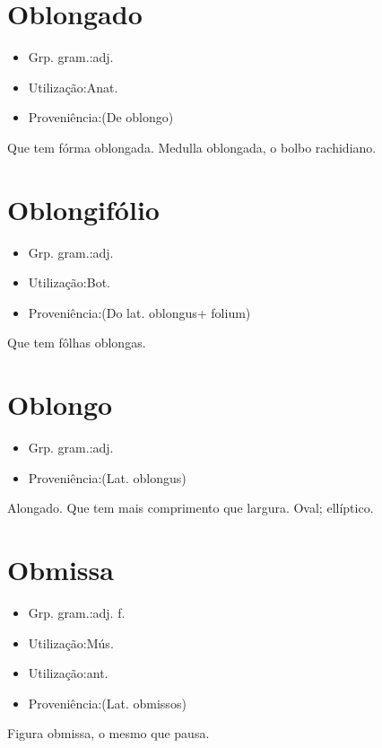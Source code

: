 \section{Oblongado}
\begin{itemize}
\item {Grp. gram.:adj.}
\end{itemize}
\begin{itemize}
\item {Utilização:Anat.}
\end{itemize}
\begin{itemize}
\item {Proveniência:(De \textunderscore oblongo\textunderscore )}
\end{itemize}
Que tem fórma oblongada.
\textunderscore Medulla oblongada\textunderscore , o bolbo rachidiano.
\section{Oblongifólio}
\begin{itemize}
\item {Grp. gram.:adj.}
\end{itemize}
\begin{itemize}
\item {Utilização:Bot.}
\end{itemize}
\begin{itemize}
\item {Proveniência:(Do lat. \textunderscore oblongus\textunderscore  + \textunderscore folium\textunderscore )}
\end{itemize}
Que tem fôlhas oblongas.
\section{Oblongo}
\begin{itemize}
\item {Grp. gram.:adj.}
\end{itemize}
\begin{itemize}
\item {Proveniência:(Lat. \textunderscore oblongus\textunderscore )}
\end{itemize}
Alongado.
Que tem mais comprimento que largura.
Oval; ellíptico.
\section{Obmissa}
\begin{itemize}
\item {Grp. gram.:adj. f.}
\end{itemize}
\begin{itemize}
\item {Utilização:Mús.}
\end{itemize}
\begin{itemize}
\item {Utilização:ant.}
\end{itemize}
\begin{itemize}
\item {Proveniência:(Lat. \textunderscore obmissos\textunderscore )}
\end{itemize}
\textunderscore Figura obmissa\textunderscore , o mesmo que \textunderscore pausa\textunderscore .
